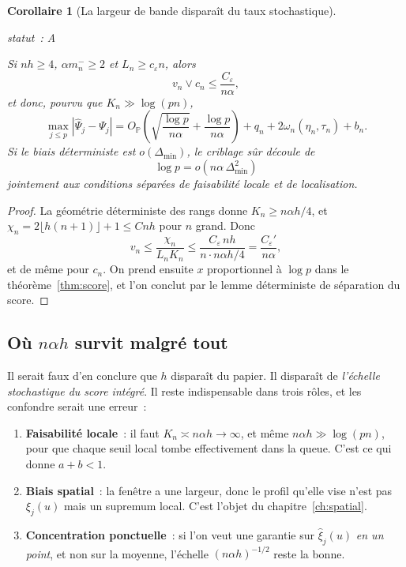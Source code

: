 \documentclass[11pt]{article}
\theoremstyle{plain}
\newtheorem{corollaire}[theoreme]{Corollaire}
\theoremstyle{definition}
\theoremstyle{remark}
\newcommand{\Pp}{\mathbb P}
\newcommand{\1}{\mathbf 1}
\newcommand{\statut}[1]{%
  \nopagebreak\par\nopagebreak
  \hfill{\normalfont\footnotesize\textcolor{gris}{statut~: #1}}%
  \par\nopagebreak\vspace{-2pt}}
\begin{document}
\begin{corollaire}[La largeur de bande disparaît du taux stochastique]
\label{cor:h}
\statut{A}
Si $nh\ge4$, $\alpha m_n^-\ge2$ et $L_n\ge c_\varepsilon n$, alors
\[
 v_n\vee c_n\le\frac{C_\varepsilon}{n\alpha},
\]
et donc, pourvu que $K_n\gg\log(pn)$,
\[
 \max_{j\le p}|\widehat\Psi_j-\Psi_j|
 =O_{\Pp}\!\left(\sqrt{\frac{\log p}{n\alpha}}+\frac{\log p}{n\alpha}\right)
 +q_n+2\omega_n(\eta_n,\tau_n)+b_n .
\]
Si le biais déterministe est $o(\Delta_{\min})$, le criblage sûr découle
de
\[
 \boxed{\ \log p=o(n\alpha\,\Delta_{\min}^2)\ }
\]
jointement aux conditions séparées de faisabilité locale et de
localisation.
\end{corollaire}

\begin{proof}
La géométrie déterministe des rangs donne $K_n\ge n\alpha h/4$, et
$\chi_n=2\lfloor h(n+1)\rfloor+1\le Cnh$ pour $n$ grand. Donc
\[
 v_n\le\frac{\chi_n}{L_nK_n}\le\frac{C_\varepsilon\,nh}{n\cdot n\alpha h/4}
 =\frac{C_\varepsilon'}{n\alpha},
\]
et de même pour $c_n$. On prend ensuite $x$ proportionnel à $\log p$ dans
le théorème~\ref{thm:score}, et l'on conclut par le lemme déterministe de
séparation du score.
\end{proof}

\subsection{Où $n\alpha h$ survit malgré tout}

Il serait faux d'en conclure que $h$ disparaît du papier. Il disparaît de
\emph{l'échelle stochastique du score intégré}. Il reste indispensable
dans trois rôles, et les confondre serait une erreur~:

\begin{enumerate}[leftmargin=2em,itemsep=3pt]
\item \textbf{Faisabilité locale}~: il faut $K_n\asymp n\alpha h\to\infty$,
et même $n\alpha h\gg\log(pn)$, pour que chaque seuil local tombe
effectivement dans la queue. C'est ce qui donne $a+b<1$.
\item \textbf{Biais spatial}~: la fenêtre a une largeur, donc le profil
qu'elle vise n'est pas $\xi_j(u)$ mais un supremum local. C'est l'objet du
chapitre~\ref{ch:spatial}.
\item \textbf{Concentration ponctuelle}~: si l'on veut une garantie sur
$\widehat\xi_j(u)$ \emph{en un point}, et non sur la moyenne, l'échelle
$(n\alpha h)^{-1/2}$ reste la bonne.
\end{enumerate}
\end{document}
